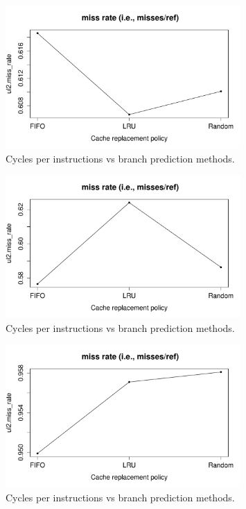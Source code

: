 \documentclass[10pt]{scrartcl}
\begin{document}
\begin{figure}[h]
  \centering
  \includegraphics[width=0.8\textwidth]{NewPlots/plot_RP_miss_rate}
  \caption{Cycles per instructions vs branch prediction methods.}\label{fig:cache-RP_miss_rate}
\end{figure}
\begin{figure}[h]
  \centering
  \includegraphics[width=0.8\textwidth]{NewPlots/plot_RP_A_miss_rate}
  \caption{Cycles per instructions vs branch prediction methods.}\label{fig:cache-RP_A_miss_rate}
\end{figure}
\begin{figure}[h]
  \centering
  \includegraphics[width=0.8\textwidth]{NewPlots/plot_RP_C_miss_rate}
  \caption{Cycles per instructions vs branch prediction methods.}\label{fig:cache-RP_C_miss_rate}
\end{figure}
\end{document}
